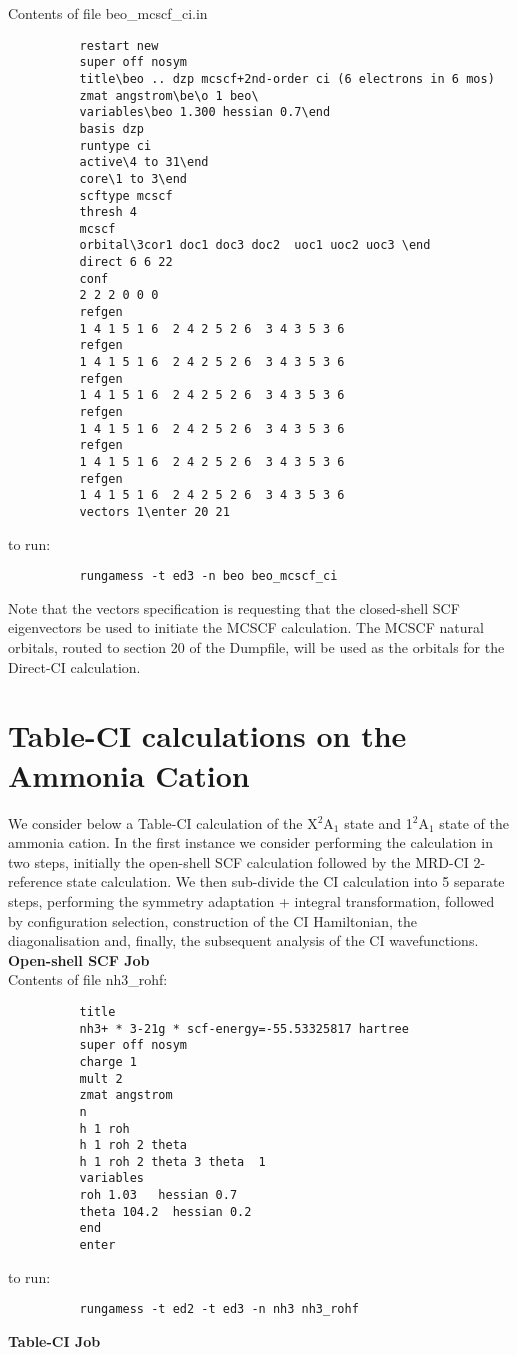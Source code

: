 \documentclass[11pt,fleqn]{article}
\begin{document}
Contents of file beo\_mcscf\_ci.in
{
\footnotesize
\begin{verbatim}
          restart new
          super off nosym
          title\beo .. dzp mcscf+2nd-order ci (6 electrons in 6 mos)
          zmat angstrom\be\o 1 beo\
          variables\beo 1.300 hessian 0.7\end
          basis dzp
          runtype ci
          active\4 to 31\end
          core\1 to 3\end
          scftype mcscf
          thresh 4
          mcscf
          orbital\3cor1 doc1 doc3 doc2  uoc1 uoc2 uoc3 \end
          direct 6 6 22
          conf 
          2 2 2 0 0 0
          refgen
          1 4 1 5 1 6  2 4 2 5 2 6  3 4 3 5 3 6
          refgen
          1 4 1 5 1 6  2 4 2 5 2 6  3 4 3 5 3 6
          refgen
          1 4 1 5 1 6  2 4 2 5 2 6  3 4 3 5 3 6
          refgen
          1 4 1 5 1 6  2 4 2 5 2 6  3 4 3 5 3 6
          refgen
          1 4 1 5 1 6  2 4 2 5 2 6  3 4 3 5 3 6
          refgen
          1 4 1 5 1 6  2 4 2 5 2 6  3 4 3 5 3 6
          vectors 1\enter 20 21
\end{verbatim}
}
to run:
{
\footnotesize
\begin{verbatim}
          rungamess -t ed3 -n beo beo_mcscf_ci
\end{verbatim}
}
Note that the vectors specification is requesting that the closed-shell
SCF eigenvectors be used to initiate the MCSCF calculation. The MCSCF
natural orbitals, routed to section 20 of the Dumpfile, will be used as
the orbitals for the Direct-CI calculation.
 

\section[Table-CI calculations on the Ammonia Cation]{Table-CI calculations on the Ammonia Cation}
We consider below a Table-CI calculation of the X$^{2}$A$_{1}$ state
and 1$^{2}$A$_{1}$ state of the ammonia cation.
In the first instance we consider performing the
calculation in two steps, initially the open-shell SCF calculation
followed by the MRD-CI 2-reference state calculation. We then
sub-divide the CI calculation into 5 separate steps, performing
the symmetry adaptation + integral transformation, followed by 
configuration selection, construction of the CI Hamiltonian,
the diagonalisation and, finally, the subsequent
analysis of the CI wavefunctions.\\

{\bf Open-shell SCF Job}\\

Contents of file nh3\_rohf:
{
\footnotesize
\begin{verbatim}
          title
          nh3+ * 3-21g * scf-energy=-55.53325817 hartree
          super off nosym
          charge 1
          mult 2
          zmat angstrom
          n
          h 1 roh
          h 1 roh 2 theta
          h 1 roh 2 theta 3 theta  1
          variables
          roh 1.03   hessian 0.7
          theta 104.2  hessian 0.2
          end
          enter
\end{verbatim}
}
to run:
{
\footnotesize
\begin{verbatim}
          rungamess -t ed2 -t ed3 -n nh3 nh3_rohf
\end{verbatim}
}
{\bf Table-CI Job}\\
\end{document}
